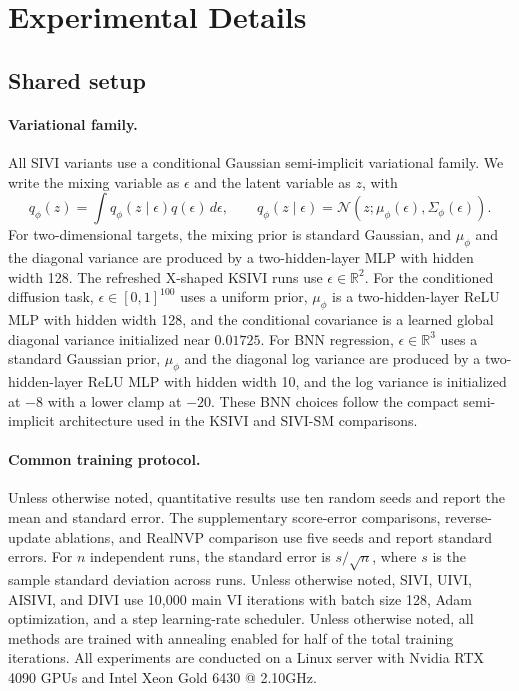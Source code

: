 
\section{Experimental Details}
\label{app:experiment-details}

\subsection{Shared setup}
\label{app:shared-setup}

\paragraph{Variational family.}
All SIVI variants use a conditional Gaussian semi-implicit variational family.  We write the mixing variable as $\epsilon$ and the latent variable as $z$, with
\begin{equation}
  q_\phi(z)
  =
  \int q_\phi(z \mid \epsilon) q(\epsilon)\,d\epsilon,
  \qquad
  q_\phi(z \mid \epsilon)
  =
  \mathcal{N}\!\left(z;\mu_\phi(\epsilon),\Sigma_\phi(\epsilon)\right).
\end{equation}
For two-dimensional targets, the mixing prior is standard Gaussian, and $\mu_\phi$ and the diagonal variance are produced by a two-hidden-layer MLP with hidden width 128. The refreshed X-shaped KSIVI runs use $\epsilon \in \mathbb{R}^{2}$.  For the conditioned diffusion task, $\epsilon \in [0,1]^{100}$ uses a uniform prior, $\mu_\phi$ is a two-hidden-layer ReLU MLP with hidden width 128, and the conditional covariance is a learned global diagonal variance initialized near $0.01725$.  For BNN regression, $\epsilon \in \mathbb{R}^{3}$ uses a standard Gaussian prior, $\mu_\phi$ and the diagonal log variance are produced by a two-hidden-layer ReLU MLP with hidden width 10, and the log variance is initialized at $-8$ with a lower clamp at $-20$.  These BNN choices follow the compact semi-implicit architecture used in the KSIVI and SIVI-SM comparisons.

\paragraph{Common training protocol.}
Unless otherwise noted, quantitative results use ten random seeds and report the mean and standard error. The supplementary score-error comparisons, reverse-update ablations, and RealNVP comparison use five seeds and report standard errors. For $n$ independent runs, the standard error is $s/\sqrt{n}$, where $s$ is the sample standard deviation across runs. Unless otherwise noted, SIVI, UIVI, AISIVI, and DIVI use 10,000 main VI iterations with batch size 128, Adam optimization, and a step learning-rate scheduler. Unless otherwise noted, all methods are trained with annealing enabled for half of the total training iterations. All experiments are conducted on a Linux server with Nvidia RTX 4090 GPUs and Intel Xeon Gold 6430 @ 2.10GHz.

